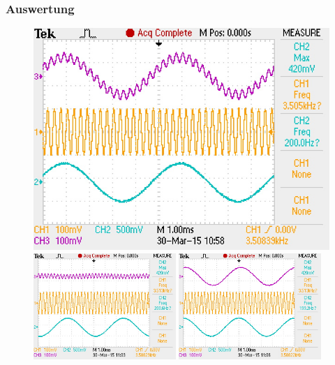 \documentclass{../Misc/MontavonLaTeX/Montavon}
\newcommand{\halfwidth}{0.48\textwidth}
\newcommand{\fullwidth}{1.0\textwidth}
\begin{document}
\subsubsection{Auswertung}
\begin{figure}[htbp]
\centering
\includegraphics[width=\fullwidth]{F0031TEK}
\includegraphics[width=\halfwidth]{F0032TEK}
\includegraphics[width=\halfwidth]{F0033TEK}

\end{figure}
\end{document}

